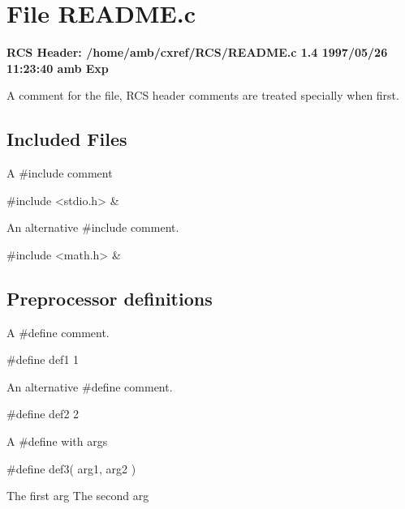 

\section{File README.c}
\label{file_README.c}

{\bf RCS Header: /home/amb/cxref/RCS/README.c 1.4 1997/05/26 11:23:40 amb Exp }

\smallskip

  A comment for the file, RCS header comments are treated specially when first.


\subsection*{Included Files}

 A \#include comment 

\smallskip
\begin{cxreftabi}
{\stt \#include <stdio.h>} &\\
\end{cxreftabi}

\medskip
 An alternative \#include comment. 

\smallskip
\begin{cxreftabi}
{\stt \#include <math.h>} &\\
\end{cxreftabi}


\subsection*{Preprocessor definitions}

 A \#define comment. 

\smallskip
{\stt \#define def1 1}

\medskip
 An alternative \#define comment. 

\smallskip
{\stt \#define def2 2}

\medskip
  A \#define with args

\smallskip
{\stt \#define def3( arg1, arg2 )}

\smallskip
\begin{cxrefarglist}
 The first arg
 The second arg
\end{cxrefarglist}

